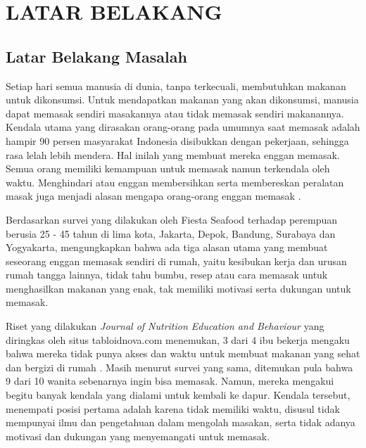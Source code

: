 
\chapter{LATAR BELAKANG}

\section{Latar Belakang Masalah}
Setiap hari semua manusia di dunia, tanpa terkecuali, membutuhkan makanan untuk dikonsumsi. Untuk mendapatkan makanan yang akan dikonsumsi, manusia dapat memasak sendiri masakannya atau tidak memasak sendiri makanannya. Kendala utama yang dirasakan orang-orang pada umumnya saat memasak adalah hampir 90 persen masyarakat Indonesia disibukkan dengan pekerjaan, sehingga rasa lelah lebih mendera. Hal inilah yang membuat mereka enggan memasak. Semua orang memiliki kemampuan untuk memasak namun terkendala oleh waktu. Menghindari atau enggan membersihkan serta membereskan peralatan masak juga menjadi alasan mengapa orang-orang enggan memasak \cite{poernomo}.

Berdasarkan survei yang dilakukan oleh Fiesta Seafood terhadap perempuan berusia 25 - 45 tahun di lima kota, Jakarta, Depok, Bandung, Surabaya dan Yogyakarta, mengungkapkan bahwa ada tiga alasan utama yang membuat seseorang enggan memasak sendiri di rumah, yaitu kesibukan kerja dan urusan rumah tangga lainnya, tidak tahu bumbu, resep atau cara memasak untuk menghasilkan makanan yang enak, tak memiliki motivasi serta dukungan untuk memasak. 

Riset yang dilakukan \emph{Journal of Nutrition Education and Behaviour} yang diringkas oleh situs tabloidnova.com menemukan, 3 dari 4 ibu bekerja mengaku bahwa mereka tidak punya akses dan waktu untuk membuat makanan yang sehat dan bergizi di rumah \cite{inirani}. Masih menurut survei yang sama, ditemukan pula bahwa 9 dari 10 wanita sebenarnya ingin bisa memasak. Namun, mereka mengakui begitu banyak kendala yang dialami untuk kembali ke dapur. Kendala tersebut, menempati posisi pertama adalah karena tidak memiliki waktu, disusul tidak mempunyai ilmu dan pengetahuan dalam mengolah masakan, serta tidak adanya motivasi dan dukungan yang menyemangati untuk memasak.

